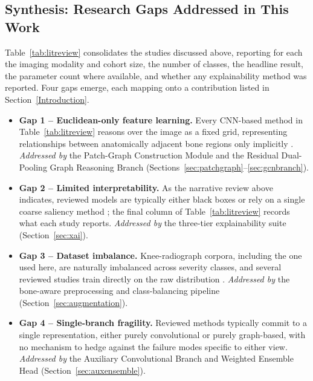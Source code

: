 \documentclass[journal]{IEEEtran}
\begin{document}
\subsection{Synthesis: Research Gaps Addressed in This Work}
\label{gaps}
Table~\ref{tab:litreview} consolidates the studies discussed above, reporting
for each the imaging modality and cohort size, the number of classes, the
headline result, the parameter count where available, and whether any
explainability method was reported. Four gaps emerge, each mapping onto a
contribution listed in Section~\ref{Introduction}.

\begin{itemize}
    \item \textbf{Gap 1 -- Euclidean-only feature learning.} Every CNN-based
    method in Table~\ref{tab:litreview} reasons over the image as a fixed grid,
    representing relationships between anatomically adjacent bone regions only
    implicitly \cite{Amani2024, Sarhan2024, mienye2025graph}.
    \emph{Addressed by} the Patch-Graph Construction Module and the Residual
    Dual-Pooling Graph Reasoning Branch
    (Sections~\ref{sec:patchgraph}--\ref{sec:gcnbranch}).

    \item \textbf{Gap 2 -- Limited interpretability.} As the narrative review
    above indicates, reviewed models are typically either black boxes or rely on
    a single coarse saliency method
    \cite{salahuddin2022transparency, gradcam}; the final column of
    Table~\ref{tab:litreview} records what each study reports.
    \emph{Addressed by} the three-tier explainability suite
    (Section~\ref{sec:xai}).

    \item \textbf{Gap 3 -- Dataset imbalance.} Knee-radiograph corpora,
    including the one used here, are naturally imbalanced across severity
    classes, and several reviewed studies train directly on the raw distribution
    \cite{wani2023osteoporosis, Naguib2024}. \emph{Addressed by} the bone-aware
    preprocessing and class-balancing pipeline (Section~\ref{sec:augmentation}).

    \item \textbf{Gap 4 -- Single-branch fragility.} Reviewed methods typically
    commit to a single representation, either purely convolutional or purely
    graph-based, with no mechanism to hedge against the failure modes specific
    to either view. \emph{Addressed by} the Auxiliary Convolutional Branch and
    Weighted Ensemble Head (Section~\ref{sec:auxensemble}).
\end{itemize}
\end{document}
